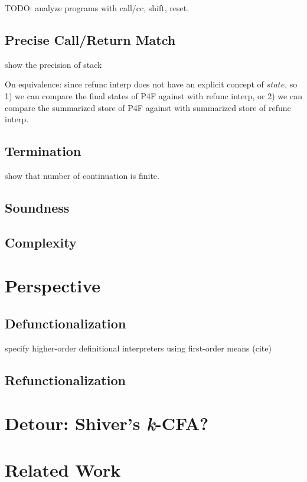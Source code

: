 \documentclass[acmsmall,review,anonymous]{acmart}\settopmatter{printfolios=true,printccs=false,printacmref=false}
\begin{document}
TODO: analyze programs with call/cc, shift, reset.

\subsection{Precise Call/Return Match}

show the precision of stack

On equivalence: since refunc interp does not have an explicit concept of $state$,
so 1) we can compare the final states of P4F against with refunc interp,
or 2) we can compare the summarized store of P4F against with summarized store of refunc interp.

\subsection{Termination}

show that number of continuation is finite.

\subsection{Soundness}

\subsection{Complexity}

\section{Perspective}

\subsection{Defunctionalization}

specify higher-order definitional interpreters using first-order means (cite)

\subsection{Refunctionalization}

\section{Detour: Shiver's \textit{k}-CFA?}

\section{Related Work}
\end{document}
